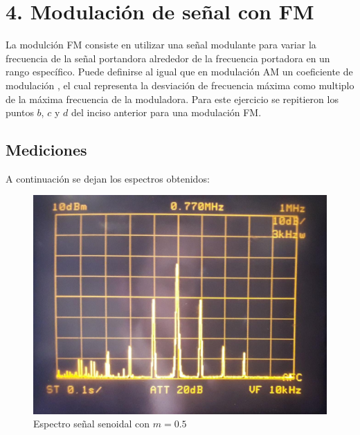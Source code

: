 \section{4. Modulaci\'on de se\~nal con FM}
La modulci\'on FM consiste en utilizar una señal modulante para variar la frecuencia de la señal portandora alrededor de la frecuencia portadora en un rango espec\'ifico. Puede definirse al igual que en modulaci\'on AM un coeficiente de modulaci\'on , el cual representa la desviaci\'on de frecuencia m\'axima como multiplo de la m\'axima frecuencia de la moduladora. Para este ejercicio se repitieron los puntos $b$, $c$ y $d$ del inciso anterior para una modulaci\'on FM. 


\subsection{Mediciones}
A continuaci\'on se dejan los espectros obtenidos:


\begin{figure}[H]
    \centering
    \includegraphics[scale=0.3]{Recursos/Ej4_senoidal.jpeg}
    \caption{Espectro señal senoidal con $m = 0.5$}
\end{figure}\label{fig:espectro1}

